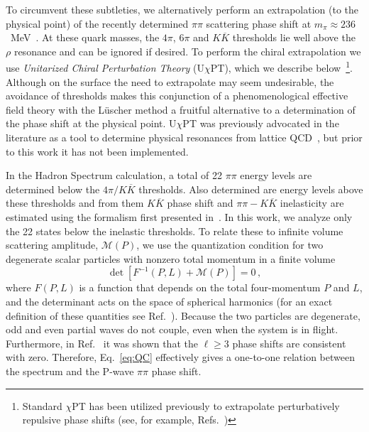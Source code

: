 \documentclass[twocolumn,hyperpdf,
amsmath,amssymb,
aps,prd,10pt,
superscriptaddress,nofootinbib,noeprint,preprintnumbers]{revtex4-1}
\begin{document}
To circumvent these subtleties, we alternatively perform an extrapolation (to the physical point) of the recently determined $\pi\pi$ scattering phase shift at $m_\pi\approx 236$~MeV~\cite{Wilson:2015dqa}. At these quark masses, the $4\pi$, $6\pi$ and $K\overline{K}$ thresholds lie well above the $\rho$ resonance and can be ignored if desired. To perform the chiral extrapolation we use \emph{Unitarized Chiral Perturbation Theory} (U$\chi$PT), which we describe below~\footnote{Standard $\chi$PT has been utilized previously to  extrapolate perturbatively repulsive phase shifts (see, for example, Refs.~\cite{Beane:2011sc, Yamazaki:2004qb})}. Although on the surface the need to extrapolate may seem undesirable, the avoidance of thresholds makes this conjunction of a phenomenological effective field theory with the L\"uscher method a fruitful alternative to a determination of the phase shift at the physical point. U$\chi$PT was previously advocated in the literature as a tool to determine physical resonances from lattice QCD~\cite{Doring:2012eu, Doring:2011vk, Bernard:2010fp, Nebreda:2011di, Rios:2008zr}, but prior to this work it has not been implemented.

In the Hadron Spectrum calculation, a total of 22 $\pi\pi$ energy levels are determined below the $4\pi/K\overline{K}$ thresholds. Also determined are energy levels above these thresholds and from them $K\overline{K}$ phase shift and $\pi\pi-K\overline{K}$ inelasticity are estimated using the formalism first presented in~\cite{Briceno:2012yi, Hansen:2012tf}. In this work, we analyze only the 22 states below the inelastic thresholds. To relate these to infinite volume scattering amplitude, $\mathcal M(P)$, we use the quantization condition for two degenerate scalar particles with nonzero total momentum in a finite volume~\cite{Luscher:1986pf, Luscher:1990ux, Rummukainen:1995vs, Kim:2005gf, Christ:2005gi}
\begin{equation}
\label{eq:QC}
\det[F^{-1}(P,L) + \mathcal M(P)] = 0\,,
\end{equation}
where $F(P,L)$ is a function that depends on the total four-momentum $P$ and $L$, and the determinant acts on the space of spherical harmonics (for an exact definition of these quantities see Ref.~\cite{Kim:2005gf}). Because the two particles are degenerate, odd and even partial waves do not couple, even when the system is in flight. Furthermore, in Ref.~\cite{Wilson:2015dqa} it was shown that the $\ell\geq3$ phase shifts are consistent with zero. Therefore, Eq.~\ref{eq:QC} effectively gives a one-to-one relation between the spectrum and the P-wave $\pi\pi$ phase shift. 
\end{document}
